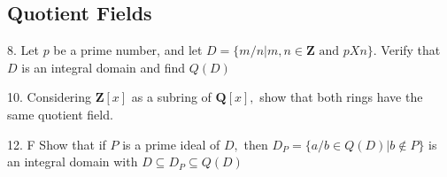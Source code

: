 \subsection{Quotient Fields}
\begin{mdframed}[style=darkQuesion]
  8. Let $p$ be a prime number, and let $D=\{m / n | m, n \in \mathbf{Z} \text { and } p X n\} .$ Verify that $D$ is an integral domain and find $Q(D)$
\end{mdframed}
\begin{mdframed}[style=darkAnswer,frametitle={Joe Starr}]
\end{mdframed}
\newpage
\begin{mdframed}[style=darkQuesion]
  10. Considering $\mathbf{Z}[x]$ as a subring of $\mathbf{Q}[x],$ show that both rings have the same quotient field.
  
\end{mdframed}
\begin{mdframed}[style=darkAnswer,frametitle={Joe Starr}]
\end{mdframed}
\newpage
\begin{mdframed}[style=darkQuesion]
  12. F Show that if $P$ is a prime ideal of $D,$ then $D_{P}=\{a / b \in Q(D) | b \notin P\}$ is an integral domain with $D \subseteq D_{P} \subseteq Q(D)$
  
\end{mdframed}
\begin{mdframed}[style=darkAnswer,frametitle={Joe Starr}]
\end{mdframed}
\newpage
